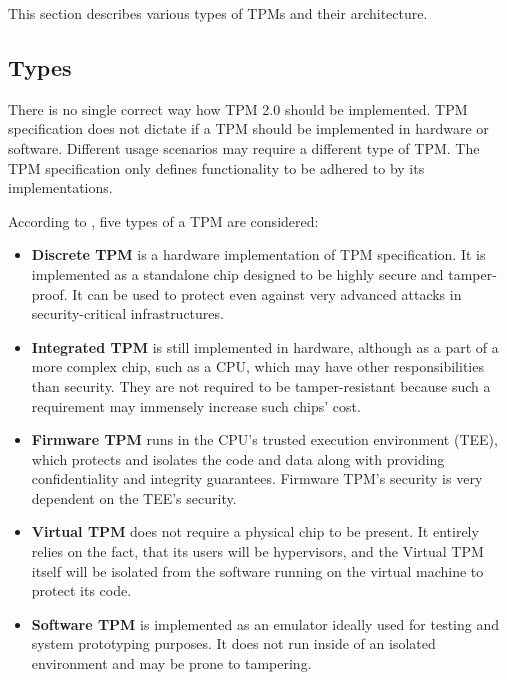 This section describes various types of TPMs and their architecture.

\subsection{Types}
There is no single correct way how TPM 2.0 should be implemented. TPM specification does not dictate if a TPM should be implemented in hardware or software. Different usage scenarios may require a different type of TPM. The TPM specification only defines functionality to be adhered to by its implementations. 

According to \cite{tcg_tpm2_briefintro}, five types of a TPM are considered:

\begin{itemize}
    \item \textbf{Discrete TPM} is a hardware implementation of TPM specification. It is implemented as a standalone chip designed to be highly secure and tamper-proof. It can be used to protect even against very advanced attacks in security-critical infrastructures.
    \item \textbf{Integrated TPM} is still implemented in hardware, although as a part of a more complex chip, such as a CPU, which may have other responsibilities than security. They are not required to be tamper-resistant because such a requirement may immensely increase such chips' cost.
    \item \textbf{Firmware TPM} runs in the CPU's trusted execution environment (TEE), which protects and isolates the code and data along with providing confidentiality and integrity guarantees. Firmware TPM's security is very dependent on the TEE's security.
    \item \textbf{Virtual TPM} does not require a physical chip to be present. It entirely relies on the fact, that its users will be hypervisors, and the Virtual TPM itself will be isolated from the software running on the virtual machine to protect its code. 
    \item \textbf{Software TPM} is implemented as an emulator ideally used for testing and system prototyping purposes. It does not run inside of an isolated environment and may be prone to tampering.
\end{itemize}




